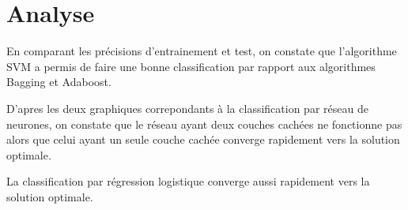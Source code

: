 \section{Analyse}
\par En comparant les précisions d'entrainement et test, on constate que l'algorithme SVM a permis de faire une bonne classification par rapport aux algorithmes Bagging et Adaboost.
\par D'apres les deux graphiques correpondants à la classification par réseau de neurones, on constate que le réseau ayant deux couches cachées ne fonctionne pas alors que  celui ayant un seule couche cachée converge rapidement vers la solution optimale.
\par La classification par régression logistique converge aussi rapidement vers la solution optimale.


